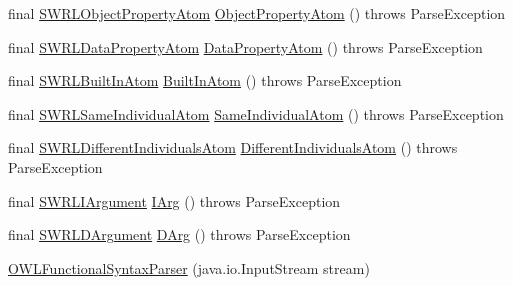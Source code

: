 \begin{DoxyCompactItemize}
\item 
final \hyperlink{interfaceorg_1_1semanticweb_1_1owlapi_1_1model_1_1_s_w_r_l_object_property_atom}{S\-W\-R\-L\-Object\-Property\-Atom} \hyperlink{classorg_1_1coode_1_1owlapi_1_1functionalparser_1_1_o_w_l_functional_syntax_parser_af33c88e1541e43accf9b66536588fd08}{Object\-Property\-Atom} ()  throws Parse\-Exception 
\item 
final \hyperlink{interfaceorg_1_1semanticweb_1_1owlapi_1_1model_1_1_s_w_r_l_data_property_atom}{S\-W\-R\-L\-Data\-Property\-Atom} \hyperlink{classorg_1_1coode_1_1owlapi_1_1functionalparser_1_1_o_w_l_functional_syntax_parser_aa71d5d41d9e60ee6e7dc6e31e7d38f13}{Data\-Property\-Atom} ()  throws Parse\-Exception 
\item 
final \hyperlink{interfaceorg_1_1semanticweb_1_1owlapi_1_1model_1_1_s_w_r_l_built_in_atom}{S\-W\-R\-L\-Built\-In\-Atom} \hyperlink{classorg_1_1coode_1_1owlapi_1_1functionalparser_1_1_o_w_l_functional_syntax_parser_a6c026badd070ee3a0595c87e61ff7c5e}{Built\-In\-Atom} ()  throws Parse\-Exception 
\item 
final \hyperlink{interfaceorg_1_1semanticweb_1_1owlapi_1_1model_1_1_s_w_r_l_same_individual_atom}{S\-W\-R\-L\-Same\-Individual\-Atom} \hyperlink{classorg_1_1coode_1_1owlapi_1_1functionalparser_1_1_o_w_l_functional_syntax_parser_a5962a6fa2eee63a9ee5c6f35847d926f}{Same\-Individual\-Atom} ()  throws Parse\-Exception 
\item 
final \hyperlink{interfaceorg_1_1semanticweb_1_1owlapi_1_1model_1_1_s_w_r_l_different_individuals_atom}{S\-W\-R\-L\-Different\-Individuals\-Atom} \hyperlink{classorg_1_1coode_1_1owlapi_1_1functionalparser_1_1_o_w_l_functional_syntax_parser_a390442e60e37ca2ff53fdb5e32de54a3}{Different\-Individuals\-Atom} ()  throws Parse\-Exception 
\item 
final \hyperlink{interfaceorg_1_1semanticweb_1_1owlapi_1_1model_1_1_s_w_r_l_i_argument}{S\-W\-R\-L\-I\-Argument} \hyperlink{classorg_1_1coode_1_1owlapi_1_1functionalparser_1_1_o_w_l_functional_syntax_parser_ae77d09ee0dd199e1badd9e3d41853bc4}{I\-Arg} ()  throws Parse\-Exception 
\item 
final \hyperlink{interfaceorg_1_1semanticweb_1_1owlapi_1_1model_1_1_s_w_r_l_d_argument}{S\-W\-R\-L\-D\-Argument} \hyperlink{classorg_1_1coode_1_1owlapi_1_1functionalparser_1_1_o_w_l_functional_syntax_parser_a177ad2ea47ed1c9309aa74e4a9a8ff43}{D\-Arg} ()  throws Parse\-Exception 
\item 
\hyperlink{classorg_1_1coode_1_1owlapi_1_1functionalparser_1_1_o_w_l_functional_syntax_parser_a62cd35e26858a0be94a6527708e3a7c6}{O\-W\-L\-Functional\-Syntax\-Parser} (java.\-io.\-Input\-Stream stream)

\end{DoxyCompactItemize}
